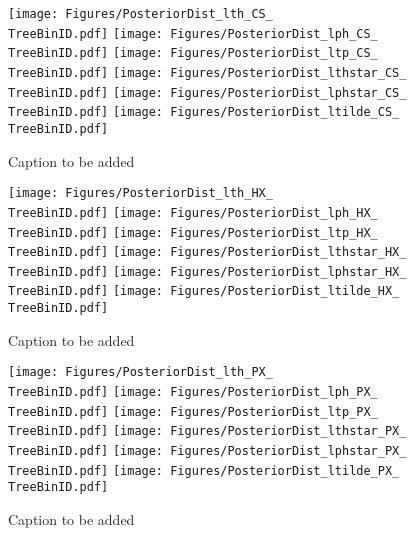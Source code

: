 \documentclass[12pt]{article}
\providecommand{\TreeBinID}[1]{TreeBinIDDefault_rap1pt1}%
\begin{document}
\begin{figure}[htbp]
\centering
\texttt{[image: Figures/PosteriorDist\_lth\_CS\_\\TreeBinID.pdf]}
\texttt{[image: Figures/PosteriorDist\_lph\_CS\_\\TreeBinID.pdf]}
\texttt{[image: Figures/PosteriorDist\_ltp\_CS\_\\TreeBinID.pdf]}
\texttt{[image: Figures/PosteriorDist\_lthstar\_CS\_\\TreeBinID.pdf]}
\texttt{[image: Figures/PosteriorDist\_lphstar\_CS\_\\TreeBinID.pdf]}
\texttt{[image: Figures/PosteriorDist\_ltilde\_CS\_\\TreeBinID.pdf]}
\caption{Caption to be added}
\end{figure}
\clearpage

\begin{figure}[htbp]
\centering
\texttt{[image: Figures/PosteriorDist\_lth\_HX\_\\TreeBinID.pdf]}
\texttt{[image: Figures/PosteriorDist\_lph\_HX\_\\TreeBinID.pdf]}
\texttt{[image: Figures/PosteriorDist\_ltp\_HX\_\\TreeBinID.pdf]}
\texttt{[image: Figures/PosteriorDist\_lthstar\_HX\_\\TreeBinID.pdf]}
\texttt{[image: Figures/PosteriorDist\_lphstar\_HX\_\\TreeBinID.pdf]}
\texttt{[image: Figures/PosteriorDist\_ltilde\_HX\_\\TreeBinID.pdf]}
\caption{Caption to be added}
\end{figure}
\clearpage

\begin{figure}[htbp]
\centering
\texttt{[image: Figures/PosteriorDist\_lth\_PX\_\\TreeBinID.pdf]}
\texttt{[image: Figures/PosteriorDist\_lph\_PX\_\\TreeBinID.pdf]}
\texttt{[image: Figures/PosteriorDist\_ltp\_PX\_\\TreeBinID.pdf]}
\texttt{[image: Figures/PosteriorDist\_lthstar\_PX\_\\TreeBinID.pdf]}
\texttt{[image: Figures/PosteriorDist\_lphstar\_PX\_\\TreeBinID.pdf]}
\texttt{[image: Figures/PosteriorDist\_ltilde\_PX\_\\TreeBinID.pdf]}
\caption{Caption to be added}
\end{figure}
\clearpage
\end{document}
